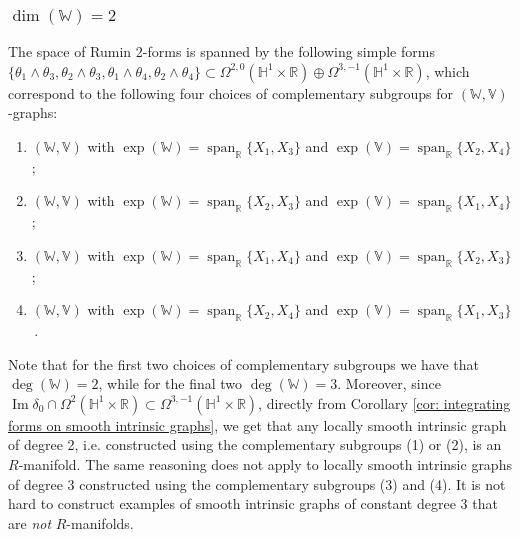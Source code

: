 \documentclass[dvipsnames]{amsart}
\theoremstyle{definition}
\theoremstyle{definition}
\numberwithin{equation}{section}
\newcommand{\W}{\mathbb{W}}
\newcommand{\V}{\mathbb{V}}
\newcommand{\R}{\mathbb{R}}
\renewcommand{\H}{\mathbb{H}}
\begin{document}
\subsubsection*{$\operatorname{dim}(\W)=2$}
The space of Rumin 2-forms is spanned by the following simple forms $\{\theta_1\wedge\theta_3,\theta_2\wedge\theta_3,\theta_1\wedge\theta_4,\theta_2\wedge\theta_4\}\subset\Omega^{2,0}(\H^1\times\R)\oplus\Omega^{3,-1}(\H^1\times\R)$, which correspond to the following four choices of complementary subgroups for $(\W,\V)$-graphs:
\begin{enumerate}
    \item $(\W,\V)$ with $\exp(\W)=\operatorname{span}_\R\{X_1,X_3\}$ and $\exp(\V)=\operatorname{span}_\R\{X_2,X_4\}$;
    \item $(\W,\V)$ with $\exp(\W)=\operatorname{span}_\R\{X_2,X_3\}$ and $\exp(\V)=\operatorname{span}_\R\{X_1,X_4\}$;
    \item $(\W,\V)$ with $\exp(\W)=\operatorname{span}_\R\{X_1,X_4\}$ and $\exp(\V)=\operatorname{span}_\R\{X_2,X_3\}$;
    \item $(\W,\V)$ with $\exp(\W)=\operatorname{span}_\R\{X_2,X_4\}$ and $\exp(\V)=\operatorname{span}_\R\{X_1,X_3\}$\,.
\end{enumerate}

Note that for the first two choices of complementary subgroups we have that $\operatorname{deg}(\W)=2$, while for the final two $\operatorname{deg}(\W)=3$. Moreover, since $\operatorname{Im}\delta_0\cap\Omega^2(\H^1\times\R)
\subset\Omega^{3,-1}(\H^1\times\R)$, directly from Corollary \ref{cor: integrating forms on smooth intrinsic graphs}, we get that any locally smooth intrinsic graph of degree 2, i.e. constructed using the complementary subgroups (1) or (2), is an $R$-manifold. The same reasoning does not apply to locally smooth intrinsic graphs of degree 3 constructed using the complementary subgroups (3) and (4). It is not hard to construct examples of smooth intrinsic graphs of constant degree 3 that are \textit{not} $R$-manifolds.
\end{document}
